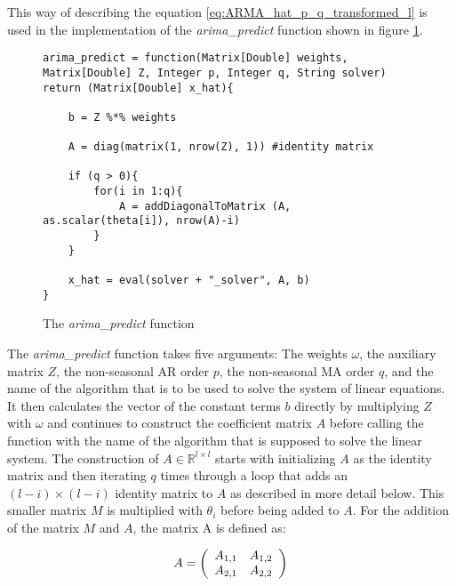 This way of describing the equation \ref{eq:ARMA_hat_p_q_transformed_l} is used in the implementation of the \textit{arima\_predict} function shown in figure \ref{fig:arima_predict}.

\begin{figure}[!ht]
\centering
\begin{verbatim}
arima_predict = function(Matrix[Double] weights, Matrix[Double] Z, Integer p, Integer q, String solver) return (Matrix[Double] x_hat){

    b = Z %*% weights
    
    A = diag(matrix(1, nrow(Z), 1)) #identity matrix
    
    if (q > 0){
        for(i in 1:q){
            A = addDiagonalToMatrix (A, as.scalar(theta[i]), nrow(A)-i)
        }
    }
    
    x_hat = eval(solver + "_solver", A, b)
}
\end{verbatim}
\vspace*{-0.3cm}
\caption{The \textit{arima\_predict} function}
\label{fig:arima_predict}
\end{figure}

The \textit{arima\_predict} function takes five arguments: The weights $\omega$, the auxiliary matrix $Z$, the non-seasonal \acl{AR} order $p$, the non-seasonal \acl{MA} order $q$, and the name of the algorithm that is to be used to solve the system of linear equations. It then calculates the vector of the constant terms $b$ directly by multiplying $Z$ with $\omega$ and continues to construct the coefficient matrix $A$ before calling the function with the name of the algorithm that is supposed to solve the linear system. The construction of $A \in \mathbb{R}^{l \times l}$ starts with initializing $A$ as the identity matrix and then iterating $q$ times through a loop that adds an $(l-i) \times (l-i)$ identity matrix to $A$ as described in more detail below. This smaller matrix $M$ is multiplied with $\theta_i$ before being added to $A$. For the addition of the matrix $M$ and $A$, the matrix A is defined as:

\begin{equation}
    A = \left(\begin{array}[c]{cc}
        A_{1,1} & A_{1,2}\\
        A_{2,1} & A_{2,2}
    \end{array}\right) 
\end{equation}

